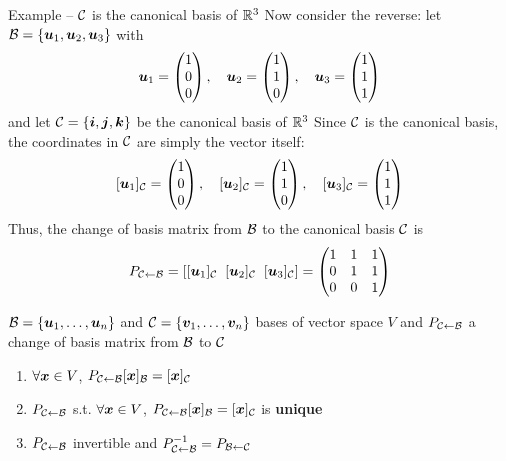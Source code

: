 \documentclass[aspectratio=169]{beamer}\usepackage[]{graphicx}\usepackage[]{xcolor}
\begin{document}
\begin{frame}{Example -- $\mathcal{C}$ is the canonical basis of $\mathbb{R}^3$}
Now consider the reverse: let $\mathcal{B}=\{\bm{u}_1,\bm{u}_2,\bm{u}_3\}$ with
\[
\bm{u}_1 = \begin{pmatrix} 1 \\ 0 \\ 0 \end{pmatrix}, \quad
\bm{u}_2 = \begin{pmatrix} 1 \\ 1 \\ 0 \end{pmatrix}, \quad
\bm{u}_3 = \begin{pmatrix} 1 \\ 1 \\ 1 \end{pmatrix}
\]
and let $\mathcal{C}=\{\bm{i},\bm{j},\bm{k}\}$ be the canonical basis of $\mathbb{R}^3$
\vfill
Since $\mathcal{C}$ is the canonical basis, the coordinates in $\mathcal{C}$ are simply the vector itself:
\[
[\bm{u}_1]_{\mathcal{C}} = \begin{pmatrix} 1 \\ 0 \\ 0 \end{pmatrix}, \quad
[\bm{u}_2]_{\mathcal{C}} = \begin{pmatrix} 1 \\ 1 \\ 0 \end{pmatrix}, \quad
[\bm{u}_3]_{\mathcal{C}} = \begin{pmatrix} 1 \\ 1 \\ 1 \end{pmatrix}
\]
\vfill
Thus, the change of basis matrix from $\mathcal{B}$ to the canonical basis $\mathcal{C}$ is
\[
P_{\mathcal{C}\leftarrow\mathcal{B}} = [[\bm{u}_1]_{\mathcal{C}} \;\; [\bm{u}_2]_{\mathcal{C}} \;\; [\bm{u}_3]_{\mathcal{C}}] = \begin{pmatrix} 1 & 1 & 1 \\ 0 & 1 & 1 \\ 0 & 0 & 1 \end{pmatrix}
\]
\end{frame}

\begin{frame}
\begin{theorem}\label{th:change-of-basis-properties}
$\mathcal{B}=\{\bm{u}_1,\ldots,\bm{u}_n\}$ and $\mathcal{C}=\{\bm{v}_1,\ldots,\bm{v}_n\}$ bases of vector space $V$ and $P_{\mathcal{C}\leftarrow\mathcal{B}}$ a change of basis matrix from $\mathcal{B}$ to $\mathcal{C}$
\begin{enumerate}
\item $\forall\bm{x}\in V$, $P_{\mathcal{C}\leftarrow\mathcal{B}}[\bm{x}]_{\mathcal{B}} = [\bm{x}]_{\mathcal{C}}$
\item $P_{\mathcal{C}\leftarrow\mathcal{B}}$ s.t. $\forall\bm{x}\in V$, $P_{\mathcal{C}\leftarrow\mathcal{B}}[\bm{x}]_{\mathcal{B}} = [\bm{x}]_{\mathcal{C}}$ is \textbf{unique}
\item $P_{\mathcal{C}\leftarrow\mathcal{B}}$ invertible and $P_{\mathcal{C}\leftarrow\mathcal{B}}^{-1}=P_{\mathcal{B}\leftarrow\mathcal{C}}$
\end{enumerate}
\end{theorem}
\end{frame}
\end{document}
